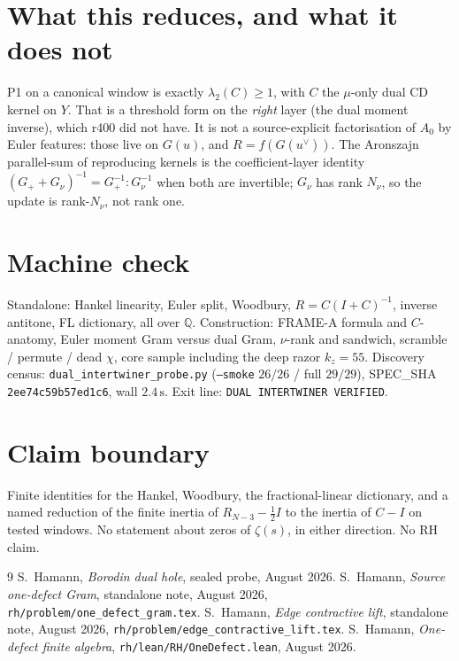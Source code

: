\documentclass[11pt]{article}
\theoremstyle{remark}
\newcommand{\half}{\tfrac12}
\begin{document}
\section{What this reduces, and what it does not}\label{sec:red}

P1 on a canonical window is exactly $\lambda_2(C)\ge 1$,
with $C$ the $\mu$-only dual CD kernel on $Y$.
That is a threshold form on the \emph{right} layer (the dual
moment inverse), which r400 did not have.
It is not a source-explicit factorisation of $A_0$ by Euler
features: those live on $G(u)$, and $R=f(G(u^\vee))$.
The Aronszajn parallel-sum of reproducing kernels is the
coefficient-layer identity
$(G_++G_\nu)^{-1}=G_+^{-1}:G_\nu^{-1}$ when both are
invertible; $G_\nu$ has rank $N_\nu$, so the update is
rank-$N_\nu$, not rank one.

\section*{Machine check}

Standalone: Hankel linearity, Euler split, Woodbury,
$R=C(I+C)^{-1}$, inverse antitone, FL dictionary, all over
$\mathbb{Q}$.
Construction: FRAME-A formula and $C$-anatomy, Euler moment
Gram versus dual Gram, $\nu$-rank and sandwich, scramble /
permute / dead $\chi$, core sample including the deep razor
$k_z=55$.
Discovery census: \texttt{dual\_intertwiner\_probe.py}
(\texttt{--smoke} $26/26$ / full $29/29$), SPEC\_SHA
\texttt{2ee74c59b57ed1c6}, wall $2.4\,\mathrm{s}$.
Exit line: \texttt{DUAL INTERTWINER VERIFIED}.

\section*{Claim boundary}

Finite identities for the Hankel, Woodbury, the
fractional-linear dictionary, and a named reduction of the
finite inertia of $R_{N-3}-\half I$ to the inertia of $C-I$
on tested windows.
No statement about zeros of $\zeta(s)$, in either direction.
No RH claim.

\begin{thebibliography}{9}
S.~Hamann,
\textit{Borodin dual hole},
sealed probe, August 2026.
S.~Hamann,
\textit{Source one-defect Gram},
standalone note, August 2026,
\texttt{rh/problem/one\_defect\_gram.tex}.
S.~Hamann,
\textit{Edge contractive lift},
standalone note, August 2026,
\texttt{rh/problem/edge\_contractive\_lift.tex}.
S.~Hamann,
\textit{One-defect finite algebra},
\texttt{rh/lean/RH/OneDefect.lean}, August 2026.
\end{thebibliography}
\end{document}

